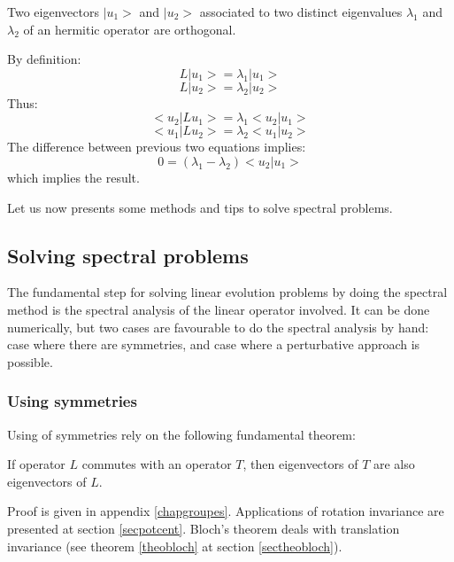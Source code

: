 \documentclass[12pt]{book}
\begin{document}
\begin{thm}
Two eigenvectors $|u_1\mathrel{>} $ and $|u_2\mathrel{>} $ associated to two distinct
eigenvalues $\lambda_1$ and $\lambda_2$ of an hermitic operator are
orthogonal. 
\end{thm}
\begin{pf}
By definition:
\begin{equation}
L|u_1\mathrel{>} =\lambda_1|u_1\mathrel{>} 
\end{equation}
\begin{equation}
L|u_2\mathrel{>} =\lambda_2|u_2\mathrel{>} 
\end{equation}
Thus:
\begin{equation}
 \mathrel{<} u_2|Lu_1\mathrel{>} =\lambda_1 \mathrel{<} u_2|u_1\mathrel{>} 
\end{equation}
\begin{equation}
 \mathrel{<} u_1|Lu_2\mathrel{>} =\lambda_2 \mathrel{<} u_1|u_2\mathrel{>} 
\end{equation}
The difference between previous two equations implies:
\begin{equation}
0=(\lambda_1-\lambda_2) \mathrel{<} u_2|u_1\mathrel{>} 
\end{equation}
which implies the result.
\end{pf}
Let us now presents some methods and tips to solve spectral problems.

\subsection{Solving spectral problems}\label{chapresospec}
The fundamental step for solving linear evolution problems by doing
the spectral 
method is the spectral analysis of the linear operator involved. It can be done
numerically, but two cases are favourable to do the spectral analysis by hand:
case where there are symmetries, and case where a perturbative approach is
possible. 
\subsubsection{Using symmetries}
Using of symmetries rely on the following fundamental theorem:
\begin{thm}
If operator $L$ commutes with an operator $T$, then eigenvectors of $T$ are
also eigenvectors of $L$. 
\end{thm}
Proof is given in appendix \ref{chapgroupes}.
Applications of rotation invariance are presented at section \ref{secpotcent}.
Bloch's theorem deals with translation invariance (see theorem \ref{theobloch}
at section \ref{sectheobloch}).
\end{document}
